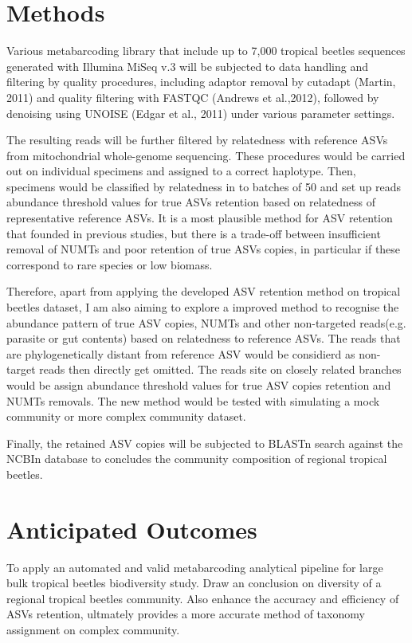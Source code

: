 \documentclass[11pt, a4paper]{article}
\begin{document}
\section*{Methods}
Various metabarcoding library that include up to 7,000 tropical beetles sequences generated with Illumina MiSeq v.3 will be subjected to data handling and filtering by quality procedures, including adaptor removal by cutadapt (Martin, 2011) and quality filtering with FASTQC (Andrews et al.,2012), followed by denoising using UNOISE (Edgar et al., 2011) under various parameter settings. 

The resulting reads will be further filtered by relatedness with reference ASVs from mitochondrial whole-genome sequencing. These procedures would be carried out on individual specimens and assigned to a correct haplotype. Then, specimens would be classified by relatedness in to batches of 50 and set up reads abundance threshold values for true ASVs retention based on relatedness of representative reference ASVs. It is a most plausible method for ASV retention that founded in previous studies, but there is a trade-off between insufficient removal of NUMTs and poor retention of true ASVs copies, in particular if these correspond to rare species or low biomass. 

Therefore, apart from applying the developed ASV retention method on tropical beetles dataset, I am also aiming to explore a improved method to recognise the abundance pattern of true ASV copies, NUMTs and other non-targeted reads(e.g. parasite or gut contents) based on relatedness to reference ASVs. The reads that are phylogenetically distant from reference ASV would be considierd as non-target reads then directly get omitted. The reads site on closely related branches would be assign abundance threshold values for true ASV copies retention and NUMTs removals. The new method would be tested with simulating a mock community or more complex community dataset. 

Finally, the retained ASV copies will be subjected to BLASTn search against the NCBIn database to concludes the community composition of regional tropical beetles.

\section*{Anticipated Outcomes}
To apply an automated and valid metabarcoding analytical pipeline for large bulk tropical beetles biodiversity study. Draw an conclusion on diversity of a regional tropical beetles community. Also enhance the accuracy and efficiency of ASVs retention, ultmately provides a more accurate method of taxonomy assignment on complex community. 
\end{document}
